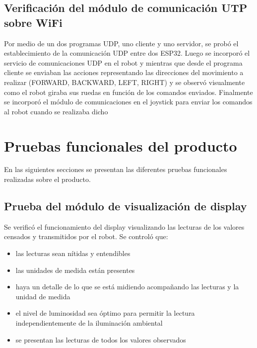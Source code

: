 \subsection{Verificación del módulo de comunicación UTP sobre WiFi}
Por medio de un dos programas UDP, uno cliente y uno servidor, se probó el establecimiento de la comunicación UDP entre dos ESP32. Luego se incorporó el servicio de comunicaciones UDP en el robot y mientras que desde el programa cliente se enviaban las acciones representando las direcciones del movimiento a realizar (FORWARD, BACKWARD, LEFT, RIGHT) y se observó visualmente como el robot giraba sus ruedas en función de los comandos enviados. Finalmente se incorporó el módulo de comunicaciones en el joystick para enviar los comandos al robot cuando se realizaba dicho


\section{Pruebas funcionales del producto}

En las siguientes secciones se presentan las diferentes pruebas funcionales realizadas sobre el producto.



\subsection{Prueba del módulo de visualización de display}

Se verificó el funcionamiento del display visualizando las lecturas de los valores censados y transmitidos por el robot. Se controló que:

\begin{itemize}
	\item las lecturas sean nítidas y entendibles
	\item las unidades de medida están presentes
	\item haya un detalle de lo que se está midiendo acompañando las lecturas y la unidad de medida
	\item el nivel de luminosidad sea óptimo para permitir la lectura independientemente de la iluminación ambiental
	\item se presentan las lecturas de todos los valores observados
\end{itemize}


